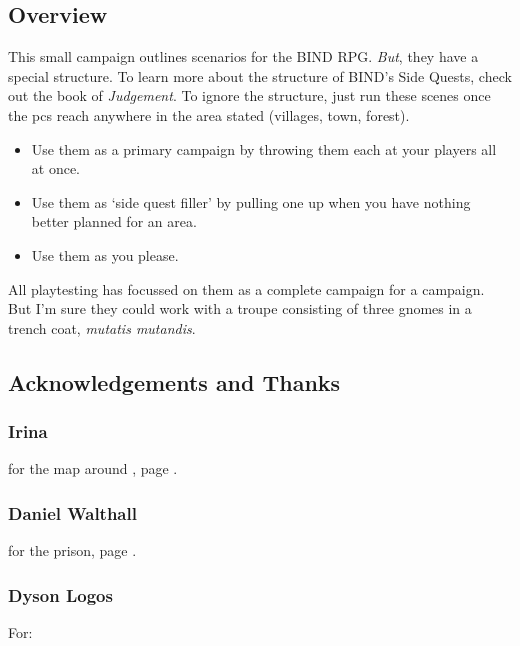 \begin{multicols}{2}

\subsection*{Overview}

This small campaign outlines scenarios for the BIND RPG.
\emph{But}, they have a special structure.
To learn more about the structure of BIND's Side Quests, check out the book of \textit{Judgement}\iftoggle{judgement}{, \autopageref{sidequests}}{}.
To ignore the structure, just run these scenes once the \glspl{pc} reach anywhere in the area stated (villages, town, forest).

\begin{itemize}
  \item
  Use them as a primary campaign by throwing them each at your players all at once.
  \item
  Use them as `side quest filler' by pulling one up when you have nothing better planned for an area.
  \item
  Use them as you please.
\end{itemize}

\noindent
All playtesting has focussed on them as a complete campaign for a  campaign.
But I'm sure they could work with a troupe consisting of three gnomes in a trench coat, \textit{mutatis mutandis}.

\subsection*{Acknowledgements and Thanks}

\subsubsection{Irina}
for the map around , page \pageref{Irina/greylands}.

\subsubsection{Daniel Walthall}
for the prison, page \pageref{Daniel_Walthall/prison}.

\subsubsection{Dyson Logos}

For:


\end{multicols}

